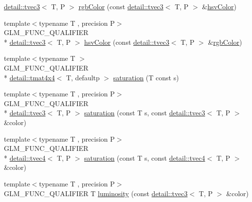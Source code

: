 \begin{DoxyCompactItemize}
\hyperlink{structglm_1_1detail_1_1tvec3}{detail\-::tvec3}$<$ T, P $>$ \hyperlink{group__gtx__color__space_gafe29cc37c2675aee66c9f9ae3e5e7294}{rgb\-Color} (const \hyperlink{structglm_1_1detail_1_1tvec3}{detail\-::tvec3}$<$ T, P $>$ \&\hyperlink{group__gtx__color__space_ga9d3d99c06af10403d317dec0cb655090}{hsv\-Color})
\item 
{\footnotesize template$<$typename T , precision P$>$ }\\G\-L\-M\-\_\-\-F\-U\-N\-C\-\_\-\-Q\-U\-A\-L\-I\-F\-I\-E\-R \\*
\hyperlink{structglm_1_1detail_1_1tvec3}{detail\-::tvec3}$<$ T, P $>$ \hyperlink{group__gtx__color__space_ga9d3d99c06af10403d317dec0cb655090}{hsv\-Color} (const \hyperlink{structglm_1_1detail_1_1tvec3}{detail\-::tvec3}$<$ T, P $>$ \&\hyperlink{group__gtx__color__space_gafe29cc37c2675aee66c9f9ae3e5e7294}{rgb\-Color})
\item 
{\footnotesize template$<$typename T $>$ }\\G\-L\-M\-\_\-\-F\-U\-N\-C\-\_\-\-Q\-U\-A\-L\-I\-F\-I\-E\-R \\*
\hyperlink{structglm_1_1detail_1_1tmat4x4}{detail\-::tmat4x4}$<$ T, defaultp $>$ \hyperlink{group__gtx__color__space_ga444bcc8582eaa894acf405762ba2a5ff}{saturation} (T const s)
\item 
{\footnotesize template$<$typename T , precision P$>$ }\\G\-L\-M\-\_\-\-F\-U\-N\-C\-\_\-\-Q\-U\-A\-L\-I\-F\-I\-E\-R \\*
\hyperlink{structglm_1_1detail_1_1tvec3}{detail\-::tvec3}$<$ T, P $>$ \hyperlink{group__gtx__color__space_ga1a6fe89b5effcc718b5f49de5bb50fad}{saturation} (const T s, const \hyperlink{structglm_1_1detail_1_1tvec3}{detail\-::tvec3}$<$ T, P $>$ \&color)
\item 
{\footnotesize template$<$typename T , precision P$>$ }\\G\-L\-M\-\_\-\-F\-U\-N\-C\-\_\-\-Q\-U\-A\-L\-I\-F\-I\-E\-R \\*
\hyperlink{structglm_1_1detail_1_1tvec4}{detail\-::tvec4}$<$ T, P $>$ \hyperlink{group__gtx__color__space_ga42cc34c45ab66e010c629106952c8bdd}{saturation} (const T s, const \hyperlink{structglm_1_1detail_1_1tvec4}{detail\-::tvec4}$<$ T, P $>$ \&color)
\item 
{\footnotesize template$<$typename T , precision P$>$ }\\G\-L\-M\-\_\-\-F\-U\-N\-C\-\_\-\-Q\-U\-A\-L\-I\-F\-I\-E\-R T \hyperlink{group__gtx__color__space_ga3fb6710bbbf4f3e2303b06946e9cf00c}{luminosity} (const \hyperlink{structglm_1_1detail_1_1tvec3}{detail\-::tvec3}$<$ T, P $>$ \&color)

\end{DoxyCompactItemize}
